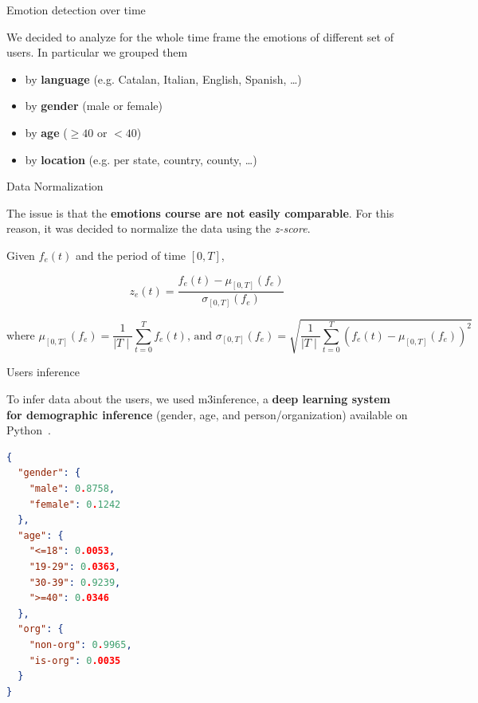 \documentclass[8pt]{beamer}  %
\begin{document}
\begin{frame}{Emotion detection over time}

    We decided to analyze for the whole time frame the emotions of different set of users. In particular we grouped them
    
    \begin{itemize}
        \item by \textbf{language} (e.g. Catalan, Italian, English, Spanish, \ldots)
        \item by \textbf{gender} (male or female)
        \item by \textbf{age} (\(\geq 40\) or \(< 40\))
        \item by \textbf{location} (e.g. per state, country, county, \ldots)
    \end{itemize}

\end{frame}

\begin{frame}{Data Normalization}

    The issue is that the \textbf{emotions course are not easily comparable}. For this reason, it was decided to normalize the data using the \textit{z-score}.
	
    \begin{definition}
    \label{def:z-score}
    	Given \(f_e(t)\) and the period of time \([0,T]\),
    	
    	\[z_e(t) = \frac{f_e(t) - \mu_{[0,T]}(f_e)}{\sigma_{[0,T]}(f_e)}\]
    	
    	\[\text{where } \mu_{[0,T]}(f_e) = \frac{1}{\mid T \mid} \sum_{t =0}^{T} f_e(t) \text{, and } \sigma_{[0,T]}(f_e) = \sqrt{\frac{1}{\mid T \mid} \sum_{t = 0}^{T} \left( f_e(t) - \mu_{[0,T]}(f_e) \right)^2 }\] 
    \end{definition}

\end{frame}

\begin{frame}[fragile]{Users inference}

	To infer data about the users, we used m3inference, a \textbf{deep learning system for demographic inference} (gender, age, and person/organization) available on Python~\autocite{wang2019demographic}.
	
\begin{lstlisting}[language=json, caption={Json object returned by m3inference}, captionpos=b, label={lst:m3inference-prediction}]
{
  "gender": {
    "male": 0.8758, 
    "female": 0.1242
  }, 
  "age": {
    "<=18": 0.0053, 
    "19-29": 0.0363, 
    "30-39": 0.9239, 
    ">=40": 0.0346
  }, 
  "org": {
    "non-org": 0.9965, 
    "is-org": 0.0035
  }
}
\end{lstlisting}
	
\end{frame}
\end{document}
